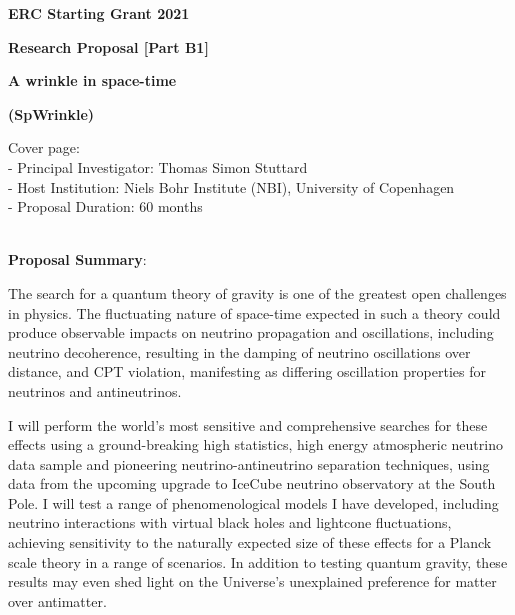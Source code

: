 \documentclass[a4paper,11pt]{article}
\renewcommand{\smallskip} {\vspace{0.1in}}
\begin{document}
\renewcommand{\headrulewidth}{0pt}



\vspace{1cm}

\centerline{ \large \textbf{ERC Starting Grant 2021}} \smallskip
\centerline{ \large \textbf {Research Proposal [Part B1]}} \smallskip

\vspace{1.0cm}

%
\centerline{\huge \textbf{A wrinkle in space-time}}
\vspace{0.5cm}
\centerline{ \huge {\bf (SpWrinkle)}} 



\vspace{1.5cm}

\noindent
Cover page: \\
- Principal Investigator: Thomas Simon Stuttard\\
- Host Institution: Niels Bohr Institute (NBI), University of Copenhagen\\
- Proposal Duration: $60$ months\\

~\vspace{0. cm}

\noindent
{\bf Proposal Summary}:

The search for a quantum theory of gravity is one of the greatest open challenges in physics. The fluctuating nature of space-time expected in such a theory could produce observable impacts on neutrino propagation and oscillations, including neutrino decoherence, resulting in the damping of neutrino oscillations over distance, and CPT violation, manifesting as differing oscillation properties for neutrinos and antineutrinos.

I will perform the world’s most sensitive and comprehensive searches for these effects using a ground-breaking high statistics, high energy atmospheric neutrino data sample and pioneering neutrino-antineutrino separation techniques, using data from the upcoming upgrade to IceCube neutrino observatory at the South Pole. I will test a range of phenomenological models I have developed, including neutrino interactions with virtual black holes and lightcone fluctuations, achieving sensitivity to the naturally expected size of these effects for a Planck scale theory in a range of scenarios. In addition to testing quantum gravity, these results may even shed light on the Universe’s unexplained preference for matter over antimatter.
\end{document}
